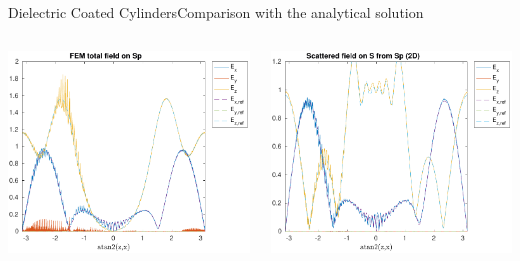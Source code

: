 \begin{frame}[allowframebreaks]{Dielectric Coated Cylinders}{Comparison with the analytical solution }
    \begin{columns}
      \includegraphics[width=\linewidth]{results/TE/E_Sp.pdf}

      \includegraphics[width=\linewidth]{results/TE/E_S.pdf}
      

\end{columns}
\end{frame}
